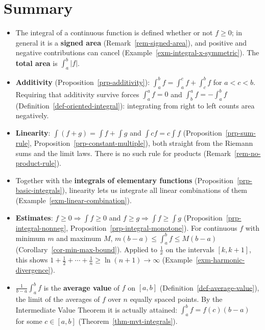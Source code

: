 \documentclass[
  letterpaper,
  DIV=11,
  numbers=noendperiod]{scrreprt}
\providecommand{\tightlist}{%
  \setlength{\itemsep}{0pt}\setlength{\parskip}{0pt}}
\theoremstyle{plain}
\theoremstyle{plain}
\theoremstyle{definition}
\theoremstyle{definition}
\theoremstyle{definition}
\theoremstyle{plain}
\theoremstyle{plain}
\theoremstyle{remark}
\begin{document}
\section{Summary}\label{summary-8}

\begin{itemize}
\tightlist
\item
  The integral of a continuous function is defined whether or not
  \(f\ge0\); in general it is a \textbf{signed area}
  (Remark~\ref{rem-signed-area}), and positive and negative
  contributions can cancel (Example~\ref{exm-integral-x-symmetric}). The
  \textbf{total area} is \(\int_a^b\lvert f \rvert\).
\item
  \textbf{Additivity} (Proposition~\ref{prp-additivity}):
  \(\int_a^b f = \int_a^c f + \int_c^b f\) for \(a<c<b\). Requiring that
  additivity survive forces \(\int_a^a f = 0\) and
  \(\int_b^a f = -\int_a^b f\) (Definition~\ref{def-oriented-integral}):
  integrating from right to left counts area negatively.
\item
  \textbf{Linearity}: \(\int(f+g) = \int f + \int g\) and
  \(\int cf = c\int f\) (Proposition~\ref{prp-sum-rule},
  Proposition~\ref{prp-constant-multiple}), both straight from the
  Riemann sums and the limit laws. There is no such rule for products
  (Remark~\ref{rem-no-product-rule}).
\item
  Together with the \textbf{integrals of elementary functions}
  (Proposition~\ref{prp-basic-integrals}), linearity lets us integrate
  all linear combinations of them
  (Example~\ref{exm-linear-combination}).
\item
  \textbf{Estimates}: \(f\ge0\Rightarrow\int f\ge0\) and
  \(f\ge g\Rightarrow\int f\ge\int g\)
  (Proposition~\ref{prp-integral-nonneg},
  Proposition~\ref{prp-integral-monotone}). For continuous \(f\) with
  minimum \(m\) and maximum \(M\), \(m(b-a)\le\int_a^b f\le M(b-a)\)
  (Corollary~\ref{cor-min-max-bound}). Applied to \(\frac1x\) on the
  intervals \([k,k+1]\), this shows
  \(1+\frac12+\cdots+\frac1n\ge\ln(n+1)\to\infty\)
  (Example~\ref{exm-harmonic-divergence}).
\item
  \(\frac1{b-a}\int_a^b f\) is the \textbf{average value} of \(f\) on
  \([a,b]\) (Definition~\ref{def-average-value}), the limit of the
  averages of \(f\) over \(n\) equally spaced points. By the
  Intermediate Value Theorem it is actually attained:
  \(\int_a^b f = f(c)(b-a)\) for some \(c\in[a,b]\)
  (Theorem~\ref{thm-mvt-integrals}).
\end{itemize}
\end{document}

